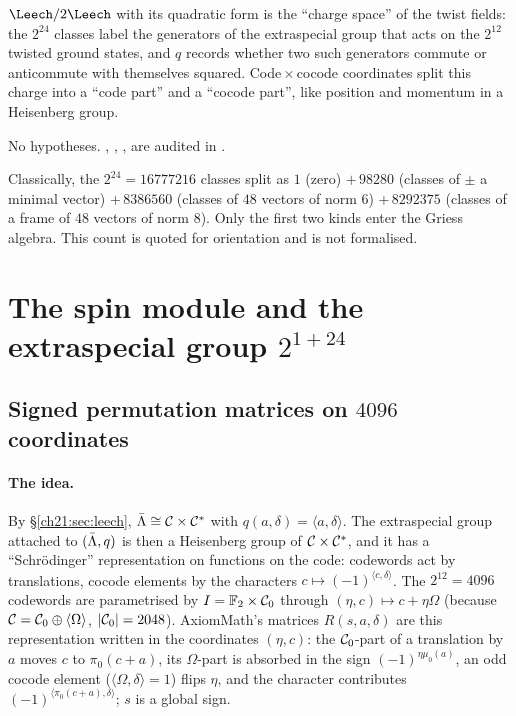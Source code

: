 \begin{physics}
$\Leech/2\Leech$ with its quadratic form is the ``charge space'' of the twist fields: the
$2^{24}$ classes label the generators of the extraspecial group that acts on the $2^{12}$ twisted
ground states, and $q$ records whether two such generators commute or anticommute with themselves
squared.  Code${}\times{}$cocode coordinates split this charge into a ``code part'' and a ``cocode
part'', like position and momentum in a Heisenberg group.
\end{physics}
\begin{status}
No hypotheses.  , , ,
 are audited in .
\end{status}

\begin{remark}\label{ch21:rem:classes}
Classically, the $2^{24}=16777216$ classes split as $1$ (zero) $+\,98280$ (classes of $\pm$ a minimal
vector) $+\,8386560$ (classes of $48$ vectors of norm $6$) $+\,8292375$ (classes of a frame of $48$
vectors of norm $8$).  Only the first two kinds enter the Griess algebra.  This count is quoted for
orientation and is not formalised.
\end{remark}

\section{The spin module and the extraspecial group \texorpdfstring{$2^{1+24}$}{2\^{}(1+24)}}\label{ch21:sec:spin}

\subsection{Signed permutation matrices on \texorpdfstring{$4096$}{4096} coordinates}

\paragraph{The idea.}  By \S\ref{ch21:sec:leech}, $\bar{\Lambda}\cong\mathcal{C}\times\mathcal{C}^*$ with
$q(a,\delta)=\langle a,\delta\rangle$.  The extraspecial group attached to $(\bar{\Lambda},q)$ is then a
Heisenberg group of $\mathcal{C}\times\mathcal{C}^*$, and it has a ``Schr\"odinger'' representation on functions
on the code: codewords act by translations, cocode elements by the characters
$c\mapsto(-1)^{\langle c,\delta\rangle}$.  The $2^{12}=4096$ codewords are parametrised by
$I=\mathbb{F}_2\times\mathcal{C}_0$ through $(\eta,c)\mapsto c+\eta\Omega$ (because
$\mathcal{C}=\mathcal{C}_0\oplus\langle\Omega\rangle$, $|\mathcal{C}_0|=2048$).  AxiomMath's matrices $R(s,a,\delta)$ are
this representation written in the coordinates $(\eta,c)$: the $\mathcal{C}_0$-part of a translation by $a$
moves $c$ to $\pi_0(c+a)$, its $\Omega$-part is absorbed in the sign $(-1)^{\eta\mu_0(a)}$, an odd cocode
element ($\langle\Omega,\delta\rangle=1$) flips $\eta$, and the character contributes
$(-1)^{\langle\pi_0(c+a),\delta\rangle}$; $s$ is a global sign.

